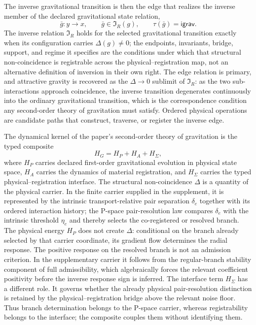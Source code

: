 \documentclass[10pt,twoside,a5paper]{article}
\newcommand{\Inv}{\ensuremath{\mathfrak I}}
\newcommand{\IGrav}{\ensuremath{\mathsf{igrav}}}
\theoremstyle{definition}
\begin{document}
The inverse gravitational transition is then the edge that realizes the inverse member
of the declared gravitational state relation,
\begin{equation}
\bar g:y\longrightarrow x,
\qquad \bar g\in\Inv_R(g),
\qquad \tau(\bar g)=\IGrav.
\label{eq:inverse-edge}
\end{equation}
The inverse relation $\Inv_R$ holds for the selected gravitational transition exactly
when its configuration carries $\Delta(g)\neq 0$; the endpoints, invariants, bridge,
support, and regime it specifies are the conditions under which that structural
non-coincidence is registrable across the physical--registration map, not an
alternative definition of inversion in their own right. The edge relation is primary,
and attractive gravity is recovered as the $\Delta\to 0$ sublimit of $\Inv_R$: as the
two sub-interactions approach coincidence, the inverse transition degenerates
continuously into the ordinary gravitational transition, which is the correspondence
condition any second-order theory of gravitation must satisfy. Ordered physical
operations are candidate paths that construct, traverse, or register the inverse edge.

The dynamical kernel of the paper's second-order theory of gravitation is the typed
composite
\begin{equation}
H_G=H_P+H_A+H_\Sigma,
\label{eq:second-order-gravitational-kernel}
\end{equation}
where $H_P$ carries declared first-order gravitational evolution in physical state
space, $H_A$ carries the dynamics of material registration, and $H_\Sigma$ carries the
typed physical--registration interface. The structural non-coincidence $\Delta$ is a quantity of the physical
carrier.  In the finite carrier supplied in the supplement, it is represented
by the intrinsic transport-relative pair separation $\delta_e$ together with
its ordered interaction history; the P-space pair-resolution law compares
$\delta_e$ with the intrinsic threshold $\eta_e$ and thereby selects the
co-registered or resolved branch.  The physical energy $H_P$ does not create
$\Delta$: conditional on the branch already selected by that carrier coordinate,
its gradient flow determines the radial response.  The positive response on the
resolved branch is not an admission criterion.  In the supplementary carrier it
follows from the regular-branch stability component of full admissibility, which
algebraically forces the relevant coefficient positivity before the inverse
response sign is inferred.  The interface term $H_\Sigma$ has a different role.
It governs whether the already physical pair-resolution distinction is retained
by the physical--registration bridge above the relevant noise floor.  Thus
branch determination belongs to the P-space carrier, whereas registrability
belongs to the interface; the composite couples them without identifying them.
\end{document}
